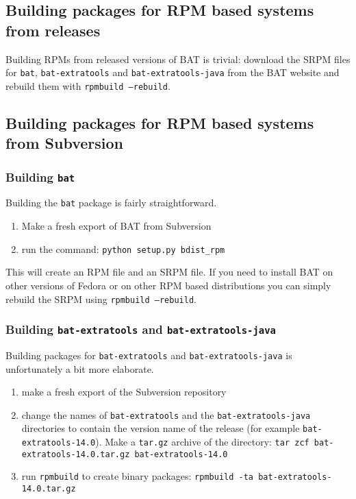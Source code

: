 \documentclass[10pt]{article}
\begin{document}
\subsection{Building packages for RPM based systems from releases}

Building RPMs from released versions of BAT is trivial: download the SRPM
files for \texttt{bat}, \texttt{bat-extratools} and
\texttt{bat-extratools-java} from the BAT website and rebuild them with
\texttt{rpmbuild --rebuild}.

\subsection{Building packages for RPM based systems from Subversion}

\subsubsection{Building \texttt{bat}}

Building the \texttt{bat} package is fairly straightforward.

\begin{enumerate}
\item Make a fresh export of BAT from Subversion
\item run the command: \texttt{python setup.py bdist\_rpm}
\end{enumerate}

This will create an RPM file and an SRPM file. If you need to install BAT on
other versions of Fedora or on other RPM based distributions you can simply
rebuild the SRPM using \texttt{rpmbuild --rebuild}.

\subsubsection{Building \texttt{bat-extratools} and
\texttt{bat-extratools-java}}

Building packages for \texttt{bat-extratools} and \texttt{bat-extratools-java}
is unfortunately a bit more elaborate.

\begin{enumerate}
\item make a fresh export of the Subversion repository
\item change the names of \texttt{bat-extratools} and the
\texttt{bat-extratools-java} directories to contain the version name of the
release (for example \texttt{bat-extratools-14.0}). Make a \texttt{tar.gz}
archive of the directory:
\texttt{tar zcf bat-extratools-14.0.tar.gz bat-extratools-14.0}
\item run \texttt{rpmbuild} to create binary packages:
\texttt{rpmbuild -ta bat-extratools-14.0.tar.gz}
\end{enumerate}
\end{document}
